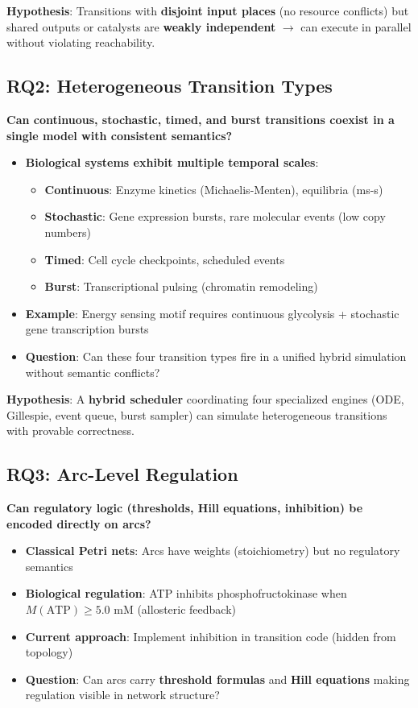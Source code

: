 \textbf{Hypothesis}: Transitions with \textbf{disjoint input places} (no resource conflicts) but shared outputs or catalysts are \textbf{weakly independent} $\to$ can execute in parallel without violating reachability.

\subsection{RQ2: Heterogeneous Transition Types}
\label{subsec:rq2}

\textbf{Can continuous, stochastic, timed, and burst transitions coexist in a single model with consistent semantics?}

\begin{itemize}
    \item \textbf{Biological systems exhibit multiple temporal scales}:
    \begin{itemize}
        \item \textbf{Continuous}: Enzyme kinetics (Michaelis-Menten), equilibria (ms-s)
        \item \textbf{Stochastic}: Gene expression bursts, rare molecular events (low copy numbers)
        \item \textbf{Timed}: Cell cycle checkpoints, scheduled events
        \item \textbf{Burst}: Transcriptional pulsing (chromatin remodeling)
    \end{itemize}
    \item \textbf{Example}: Energy sensing motif requires continuous glycolysis + stochastic gene transcription bursts
    \item \textbf{Question}: Can these four transition types fire in a unified hybrid simulation without semantic conflicts?
\end{itemize}

\textbf{Hypothesis}: A \textbf{hybrid scheduler} coordinating four specialized engines (ODE, Gillespie, event queue, burst sampler) can simulate heterogeneous transitions with provable correctness.

\subsection{RQ3: Arc-Level Regulation}
\label{subsec:rq3}

\textbf{Can regulatory logic (thresholds, Hill equations, inhibition) be encoded directly on arcs?}

\begin{itemize}
    \item \textbf{Classical Petri nets}: Arcs have weights (stoichiometry) but no regulatory semantics
    \item \textbf{Biological regulation}: ATP inhibits phosphofructokinase when $M(\text{ATP}) \geq 5.0$ mM (allosteric feedback)
    \item \textbf{Current approach}: Implement inhibition in transition code (hidden from topology)
    \item \textbf{Question}: Can arcs carry \textbf{threshold formulas} and \textbf{Hill equations} making regulation visible in network structure?
\end{itemize}

